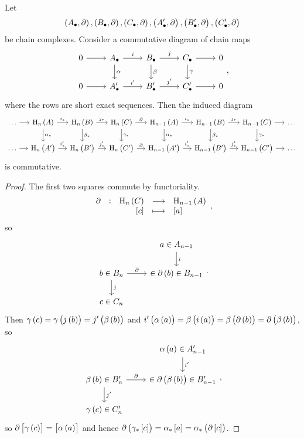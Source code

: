 \begin{proposition}
Let
$$ \br{A_\bullet, \partial}, \br{B_\bullet, \partial}, \br{C_\bullet, \partial}, \br{A_\bullet', \partial}, \br{B_\bullet', \partial}, \br{C_\bullet', \partial} $$
be chain complexes. Consider a commutative diagram of chain maps
$$
\begin{tikzcd}
0 \arrow{r} & A_\bullet \arrow{r}{i} \arrow{d}{\alpha} & B_\bullet \arrow{r}{j} \arrow{d}{\beta} & C_\bullet \arrow{r} \arrow{d}{\gamma} & 0 \\
0 \arrow{r} & A_\bullet' \arrow{r}{i'} & B_\bullet' \arrow{r}{j'} & C_\bullet' \arrow{r} & 0
\end{tikzcd},
$$
where the rows are short exact sequences. Then the induced diagram
$$
\begin{tikzcd}[column sep=small]
\dots \arrow{r} & \H_n\br{A} \arrow{r}{i_*} \arrow{d}{\alpha_*} & \H_n\br{B} \arrow{r}{j_*} \arrow{d}{\beta_*} & \H_n\br{C} \arrow{r}{\partial} \arrow{d}{\gamma_*} & \H_{n - 1}\br{A} \arrow{r}{i_*} \arrow{d}{\alpha_*} & \H_{n - 1}\br{B} \arrow{r}{j_*} \arrow{d}{\beta_*} & \H_{n - 1}\br{C} \arrow{r} \arrow{d}{\gamma_*} & \dots \\
\dots \arrow{r} & \H_n\br{A'} \arrow{r}{i_*'} & \H_n\br{B'} \arrow{r}{j_*'} & \H_n\br{C'} \arrow{r}{\partial} & \H_{n - 1}\br{A'} \arrow{r}{i_*'} & \H_{n - 1}\br{B'} \arrow{r}{j_*'} & \H_{n - 1}\br{C'} \arrow{r} & \dots
\end{tikzcd}
$$
is commutative.
\end{proposition}

\begin{proof}
The first two squares commute by functoriality.
$$ \function[\partial]{\H_n\br{C}}{\H_{n - 1}\br{A}}{\sbr{c}}{\sbr{a}}, $$
so
$$
\begin{tikzcd}
& a \in A_{n - 1} \arrow{d}{i} \\
b \in B_n \arrow{r}{\partial} \arrow{d}{j} & \in \partial\br{b} \in B_{n - 1} \\
c \in C_n &
\end{tikzcd}.
$$
Then $ \gamma\br{c} = \gamma\br{j\br{b}} = j'\br{\beta\br{b}} $ and $ i'\br{\alpha\br{a}} = \beta\br{i\br{a}} = \beta\br{\partial\br{b}} = \partial\br{\beta\br{b}} $, so
$$
\begin{tikzcd}
& \alpha\br{a} \in A_{n - 1}' \arrow{d}{i'} \\
\beta\br{b} \in B_n' \arrow{r}{\partial} \arrow{d}{j'} & \in \partial\br{\beta\br{b}} \in B_{n - 1}' \\
\gamma\br{c} \in C_n' &
\end{tikzcd},
$$
so $ \partial\sbr{\gamma\br{c}} = \sbr{\alpha\br{a}} $ and hence $ \partial\br{\gamma_*\sbr{c}} = \alpha_*\sbr{a} = \alpha_*\br{\partial\sbr{c}} $.
\end{proof}

